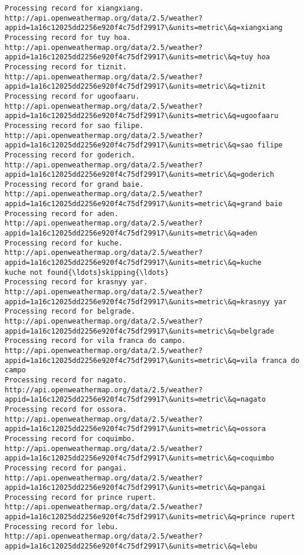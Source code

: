 \documentclass[11pt]{article}
\begin{document}
\begin{Verbatim}[commandchars=\\\{\}]
Processing record for xiangxiang.
http://api.openweathermap.org/data/2.5/weather?appid=1a16c12025dd2256e920f4c75df29917\&units=metric\&q=xiangxiang
Processing record for tuy hoa.
http://api.openweathermap.org/data/2.5/weather?appid=1a16c12025dd2256e920f4c75df29917\&units=metric\&q=tuy hoa
Processing record for tiznit.
http://api.openweathermap.org/data/2.5/weather?appid=1a16c12025dd2256e920f4c75df29917\&units=metric\&q=tiznit
Processing record for ugoofaaru.
http://api.openweathermap.org/data/2.5/weather?appid=1a16c12025dd2256e920f4c75df29917\&units=metric\&q=ugoofaaru
Processing record for sao filipe.
http://api.openweathermap.org/data/2.5/weather?appid=1a16c12025dd2256e920f4c75df29917\&units=metric\&q=sao filipe
Processing record for goderich.
http://api.openweathermap.org/data/2.5/weather?appid=1a16c12025dd2256e920f4c75df29917\&units=metric\&q=goderich
Processing record for grand baie.
http://api.openweathermap.org/data/2.5/weather?appid=1a16c12025dd2256e920f4c75df29917\&units=metric\&q=grand baie
Processing record for aden.
http://api.openweathermap.org/data/2.5/weather?appid=1a16c12025dd2256e920f4c75df29917\&units=metric\&q=aden
Processing record for kuche.
http://api.openweathermap.org/data/2.5/weather?appid=1a16c12025dd2256e920f4c75df29917\&units=metric\&q=kuche
kuche not found{\ldots}skipping{\ldots}
Processing record for krasnyy yar.
http://api.openweathermap.org/data/2.5/weather?appid=1a16c12025dd2256e920f4c75df29917\&units=metric\&q=krasnyy yar
Processing record for belgrade.
http://api.openweathermap.org/data/2.5/weather?appid=1a16c12025dd2256e920f4c75df29917\&units=metric\&q=belgrade
Processing record for vila franca do campo.
http://api.openweathermap.org/data/2.5/weather?appid=1a16c12025dd2256e920f4c75df29917\&units=metric\&q=vila franca do campo
Processing record for nagato.
http://api.openweathermap.org/data/2.5/weather?appid=1a16c12025dd2256e920f4c75df29917\&units=metric\&q=nagato
Processing record for ossora.
http://api.openweathermap.org/data/2.5/weather?appid=1a16c12025dd2256e920f4c75df29917\&units=metric\&q=ossora
Processing record for coquimbo.
http://api.openweathermap.org/data/2.5/weather?appid=1a16c12025dd2256e920f4c75df29917\&units=metric\&q=coquimbo
Processing record for pangai.
http://api.openweathermap.org/data/2.5/weather?appid=1a16c12025dd2256e920f4c75df29917\&units=metric\&q=pangai
Processing record for prince rupert.
http://api.openweathermap.org/data/2.5/weather?appid=1a16c12025dd2256e920f4c75df29917\&units=metric\&q=prince rupert
Processing record for lebu.
http://api.openweathermap.org/data/2.5/weather?appid=1a16c12025dd2256e920f4c75df29917\&units=metric\&q=lebu

\end{Verbatim}
\end{document}
